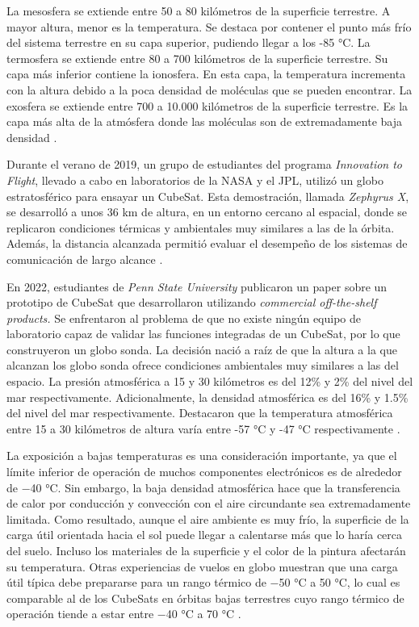 \documentclass[12pt,a4paper]{article}
\begin{document}
La mesosfera se extiende entre 50 a 80 kilómetros de la superficie terrestre. A mayor altura, menor es la temperatura. Se destaca por contener el punto más frío del sistema terrestre en su capa superior, pudiendo llegar a los -85 °C. La termosfera se extiende entre 80 a 700 kilómetros de la superficie terrestre. Su capa más inferior contiene la ionosfera. En esta capa, la temperatura incrementa con la altura debido a la poca densidad de moléculas que se pueden encontrar. La exosfera se extiende entre 700 a 10.000 kilómetros de la superficie terrestre. Es la capa más alta de la atmósfera donde las moléculas son de extremadamente baja densidad \cite{ref1}.

Durante el verano de 2019, un grupo de estudiantes del programa \emph{Innovation to Flight}, llevado a cabo en laboratorios de la NASA y el JPL, utilizó un globo estratosférico para ensayar un CubeSat. Esta demostración, llamada \emph{Zephyrus X}, se desarrolló a unos 36 km de altura, en un entorno cercano al espacial, donde se replicaron condiciones térmicas y ambientales muy similares a las de la órbita. Además, la distancia alcanzada permitió evaluar el desempeño de los sistemas de comunicación de largo alcance \cite{ref2}.

En 2022, estudiantes de \emph{Penn State University} publicaron un paper sobre un prototipo de CubeSat que desarrollaron utilizando \emph{commercial off-the-shelf products.} Se enfrentaron al problema de que no existe ningún equipo de laboratorio capaz de validar las funciones integradas de un CubeSat, por lo que construyeron un globo sonda. La decisión nació a raíz de que la altura a la que alcanzan los globo sonda ofrece condiciones ambientales muy similares a las del espacio. La presión atmosférica a 15 y 30 kilómetros es del 12\% y 2\% del nivel del mar respectivamente. Adicionalmente, la densidad atmosférica es del 16\% y 1.5\% del nivel del mar respectivamente. Destacaron que la temperatura atmosférica entre 15 a 30 kilómetros de altura varía entre -57 °C y -47 °C respectivamente \cite{ref3}.

La exposición a bajas temperaturas es una consideración importante, ya que el límite inferior de operación de muchos componentes electrónicos es de alrededor de −40 °C. Sin embargo, la baja densidad atmosférica hace que la transferencia de calor por conducción y convección con el aire circundante sea extremadamente limitada. Como resultado, aunque el aire ambiente es muy frío, la superficie de la carga útil orientada hacia el sol puede llegar a calentarse más que lo haría cerca del suelo. Incluso los materiales de la superficie y el color de la pintura afectarán su temperatura. Otras experiencias de vuelos en globo muestran que una carga útil típica debe prepararse para un rango térmico de −50 °C a 50 °C, lo cual es comparable al de los CubeSats en órbitas bajas terrestres cuyo rango térmico de operación tiende a estar entre −40 °C a 70 °C \cite{ref3}.
\end{document}
